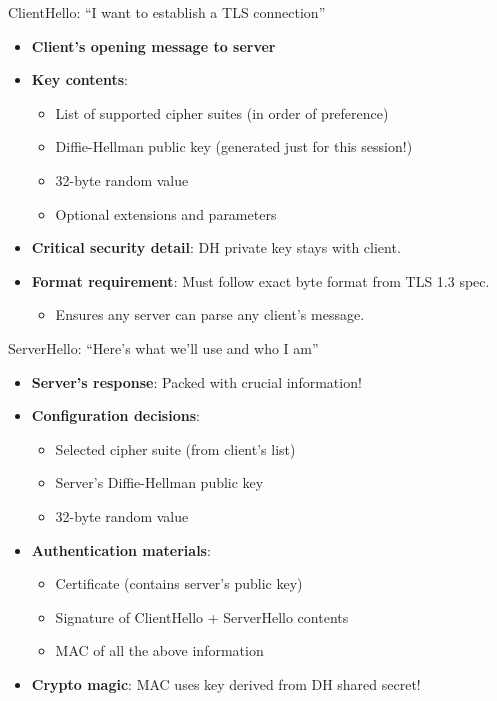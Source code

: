 \documentclass[aspectratio=169, lualatex, handout]{beamer}
\begin{document}
\begin{frame}{ClientHello: ``I want to establish a TLS connection''}
	\begin{itemize}
		\item \textbf{Client's opening message to server}
		\item \textbf{Key contents}:
		      \begin{itemize}
			      \item List of supported cipher suites (in order of preference)
			      \item Diffie-Hellman public key (generated just for this session!)
			      \item 32-byte random value
			      \item Optional extensions and parameters
		      \end{itemize}
		\item \textbf{Critical security detail}: DH private key stays with client.
		\item \textbf{Format requirement}: Must follow exact byte format from TLS 1.3 spec.
		      \begin{itemize}
			      \item Ensures any server can parse any client's message.
		      \end{itemize}
	\end{itemize}
\end{frame}

\begin{frame}{ServerHello: ``Here's what we'll use and who I am''}
	\begin{itemize}
		\item \textbf{Server's response}: Packed with crucial information!
		\item \textbf{Configuration decisions}:
		      \begin{itemize}
			      \item Selected cipher suite (from client's list)
			      \item Server's Diffie-Hellman public key
			      \item 32-byte random value
		      \end{itemize}
		\item \textbf{Authentication materials}:
		      \begin{itemize}
			      \item Certificate (contains server's public key)
			      \item Signature of ClientHello + ServerHello contents
			      \item MAC of all the above information
		      \end{itemize}
		\item \textbf{Crypto magic}: MAC uses key derived from DH shared secret!
	\end{itemize}
\end{frame}
\end{document}
